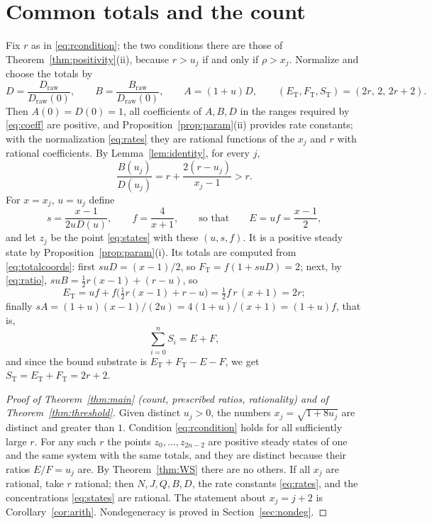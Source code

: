 \documentclass[11pt]{article}
\theoremstyle{plain}
\theoremstyle{definition}
\theoremstyle{remark}
\numberwithin{equation}{section}
\newcommand{\raw}{\mathrm{raw}}
\newcommand{\ET}{E_{\mathrm T}}
\newcommand{\FT}{F_{\mathrm T}}
\newcommand{\ST}{S_{\mathrm T}}
\begin{document}
\section{Common totals and the count}\label{sec:assembly}
Fix \(r\) as in \eqref{eq:rcondition}; the two conditions there are those of
Theorem~\ref{thm:positivity}(ii), because \(r>u_j\) if and only if \(\rho>x_j\). Normalize and
choose the totals by
\begin{equation}\label{eq:normalize}
 D=\frac{D_{\raw}}{D_{\raw}(0)},\qquad B=\frac{B_{\raw}}{D_{\raw}(0)},\qquad
 A=(1+u)D,\qquad (\ET,\FT,\ST)=(2r,\,2,\,2r+2).
\end{equation}
Then \(A(0)=D(0)=1\), all coefficients of \(A,B,D\) in the ranges required by \eqref{eq:coeff}
are positive, and Proposition~\ref{prop:param}(ii) provides rate constants; with the
normalization \eqref{eq:rates} they are rational functions of the \(x_j\) and \(r\) with
rational coefficients. By Lemma~\ref{lem:identity}, for every \(j\),
\begin{equation}\label{eq:ratio}
 \frac{B(u_j)}{D(u_j)}=r+\frac{2(r-u_j)}{x_j-1}>r .
\end{equation}
For \(x=x_j\), \(u=u_j\) define
\begin{equation}\label{eq:sf}
 s=\frac{x-1}{2uD(u)},\qquad f=\frac{4}{x+1},\qquad\text{so that}\qquad E=uf=\frac{x-1}{2},
\end{equation}
and let \(z_j\) be the point \eqref{eq:states} with these \((u,s,f)\). It is a positive steady
state by Proposition~\ref{prop:param}(i). Its totals are computed from \eqref{eq:totalcoords}:
first \(suD=(x-1)/2\), so \(\FT=f(1+suD)=2\); next, by \eqref{eq:ratio},
\(suB=\tfrac12r(x-1)+(r-u)\), so
\[
 \ET=uf+f\bigl(\tfrac12r(x-1)+r-u\bigr)=\tfrac12 f\,r\,(x+1)=2r ;
\]
finally \(sA=(1+u)(x-1)/(2u)=4(1+u)/(x+1)=(1+u)f\), that is,
\begin{equation}\label{eq:freeinventory}
 \sum_{i=0}^nS_i=E+F ,
\end{equation}
and since the bound substrate is \(\ET+\FT-E-F\), we get \(\ST=\ET+\FT=2r+2\).

\begin{proof}[Proof of Theorem~\ref{thm:main} (count, prescribed ratios, rationality) and of
Theorem~\ref{thm:threshold}]
Given distinct \(u_j>0\), the numbers \(x_j=\sqrt{1+8u_j}\) are distinct and greater than
\(1\). Condition \eqref{eq:rcondition} holds for all sufficiently large \(r\). For any such
\(r\) the points \(z_0,\dots,z_{2n-2}\) are positive steady states of one and the same system
with the same totals, and they are distinct because their ratios \(E/F=u_j\) are. By
Theorem~\ref{thm:WS} there are no others. If all \(x_j\) are rational, take \(r\) rational;
then \(N,J,Q,B,D\), the rate constants \eqref{eq:rates}, and the concentrations
\eqref{eq:states} are rational. The statement about \(x_j=j+2\) is
Corollary~\ref{cor:arith}. Nondegeneracy is proved in Section~\ref{sec:nondeg}.
\end{proof}
\end{document}
